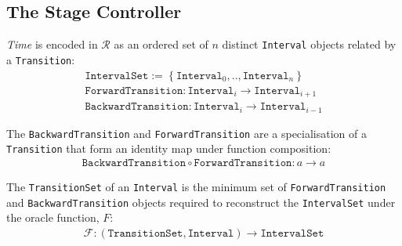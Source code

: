 \documentclass{article}
\numberwithin{equation}{section}
\begin{document}


\subsection{The Stage Controller}

\textit{Time} is encoded in $\mathcal{R}$ as an ordered set of $n$ distinct \texttt{Interval} objects related by a \texttt{Transition}:
\begin{align}
	\texttt{IntervalSet} := \ \{ \ \texttt{Interval}_0, .., \texttt{Interval}_n \ \} \\
	\texttt{ForwardTransition} : \texttt{Interval}_i \rightarrow \texttt{Interval}_{i + 1}\\
	\texttt{BackwardTransition} : \texttt{Interval}_i \rightarrow \texttt{Interval}_{i - 1}
\end{align}

The \texttt{BackwardTransition} and \texttt{ForwardTransition} are a specialisation of a \texttt{Transition} that form an identity map under function composition:
\begin{align}
	\texttt{BackwardTransition} \circ \texttt{ForwardTransition} : a \rightarrow a
\end{align}

The \texttt{TransitionSet} of an \texttt{Interval} is the minimum set of \texttt{ForwardTransition} and \texttt{BackwardTransition} objects required to reconstruct the \texttt{IntervalSet} under the oracle function, $F$:
\begin{align}
	\mathcal{F}: (\texttt{TransitionSet}, \texttt{Interval}) \rightarrow  \texttt{IntervalSet}
\end{align}
\end{document}
